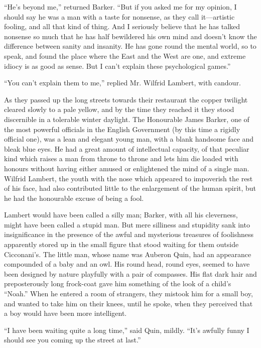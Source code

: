 \documentclass{book}
\begin{document}
“He’s beyond me,” returned Barker. “But if you asked me for my opinion, I should say he was a man with a taste for nonsense, as they call it—artistic fooling, and all that kind of thing. And I seriously believe that he has talked nonsense so much that he has half bewildered his own mind and doesn’t know the difference between sanity and insanity. He has gone round the mental world, so to speak, and found the place where the East and the West are one, and extreme idiocy is as good as sense. But I can’t explain these psychological games.”

“You can’t explain them to me,” replied Mr. Wilfrid Lambert, with candour.

As they passed up the long streets towards their restaurant the copper twilight cleared slowly to a pale yellow, and by the time they reached it they stood discernible in a tolerable winter daylight. The Honourable James Barker, one of the most powerful officials in the English Government (by this time a rigidly official one), was a lean and elegant young man, with a blank handsome face and bleak blue eyes. He had a great amount of intellectual capacity, of that peculiar kind which raises a man from throne to throne and lets him die loaded with honours without having either amused or enlightened the mind of a single man. Wilfrid Lambert, the youth with the nose which appeared to impoverish the rest of his face, had also contributed little to the enlargement of the human spirit, but he had the honourable excuse of being a fool.

Lambert would have been called a silly man; Barker, with all his cleverness, might have been called a stupid man. But mere silliness and stupidity sank into insignificance in the presence of the awful and mysterious treasures of foolishness apparently stored up in the small figure that stood waiting for them outside Cicconani’s. The little man, whose name was Auberon Quin, had an appearance compounded of a baby and an owl. His round head, round eyes, seemed to have been designed by nature playfully with a pair of compasses. His flat dark hair and preposterously long frock-coat gave him something of the look of a child’s “Noah.” When he entered a room of strangers, they mistook him for a small boy, and wanted to take him on their knees, until he spoke, when they perceived that a boy would have been more intelligent.

“I have been waiting quite a long time,” said Quin, mildly. “It’s awfully funny I should see you coming up the street at last.”
\end{document}
